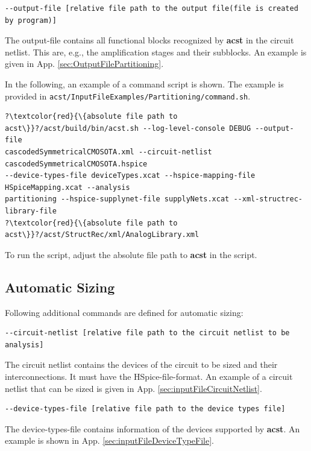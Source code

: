 \begin{lstlisting}[basicstyle=\ttfamily\scriptsize,backgroundcolor={\color{gray!30}}, escapechar=? ]
--output-file [relative file path to the output file(file is created by program)] 
\end{lstlisting}
The output-file contains all functional blocks recognized by {\bf acst} in the circuit netlist. This are, e.g., the amplification stages and their subblocks. An example is given in App. \ref{sec:OutputFilePartitioning}.

In the following, an example of a command script is shown. The example is provided in {\tt acst/InputFileExamples/Partitioning/command.sh}.
\begin{lstlisting}[basicstyle=\ttfamily\scriptsize,backgroundcolor={\color{gray!30}}, escapechar=? ]
?\textcolor{red}{\{absolute file path to acst\}}?/acst/build/bin/acst.sh --log-level-console DEBUG --output-file
cascodedSymmetricalCMOSOTA.xml --circuit-netlist cascodedSymmetricalCMOSOTA.hspice 
--device-types-file deviceTypes.xcat --hspice-mapping-file HSpiceMapping.xcat --analysis 
partitioning --hspice-supplynet-file supplyNets.xcat --xml-structrec-library-file
?\textcolor{red}{\{absolute file path to acst\}}?/acst/StructRec/xml/AnalogLibrary.xml
\end{lstlisting}
To run the script, adjust the absolute file path to {\bf acst} in the script.


\subsection{Automatic Sizing}\label{sec:commandsAutomaticSizing}
Following additional commands are defined for automatic sizing:
\\

\begin{lstlisting}[basicstyle=\ttfamily\scriptsize,backgroundcolor={\color{gray!30}}, escapechar=? ]
--circuit-netlist [relative file path to the circuit netlist to be analysis]
\end{lstlisting}
The circuit netlist contains the devices of the circuit to be sized and their interconnections. It must have the HSpice-file-format. An example of a circuit netlist that can be sized is given in App. \ref{sec:inputFileCircuitNetlist}. 
\\

\begin{lstlisting}[basicstyle=\ttfamily\scriptsize,backgroundcolor={\color{gray!30}}, escapechar=? ]
--device-types-file [relative file path to the device types file]
\end{lstlisting}
The device-types-file contains information of the devices supported by {\bf acst}. An example is shown in App. \ref{sec:inputFileDeviceTypeFile}.
\\

